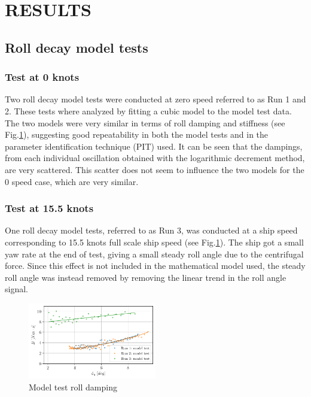\section*{RESULTS}\label{results}
\subsection*{Roll decay model tests}\label{roll-decay-model-tests}
\subsubsection*{Test at 0 knots}\label{test-at-0-knots}
Two roll decay model tests were conducted at zero speed referred to as
Run 1 and 2.
These tests where analyzed by fitting a cubic model
to the model test data. The two models were very similar in terms of
roll damping and stiffness (see Fig.\ref{fig:mdl}), suggesting
good repeatability in both the model tests and in the parameter
identification technique (PIT) used. It can be seen that the dampings,
from each individual oscillation obtained with the logarithmic decrement
method, are very scattered. This scatter does not seem to influence the
two models for the 0 speed case, which are very similar.
\subsubsection*{Test at 15.5 knots}\label{test-at-15.5-knots}
One roll decay model tests, referred to as Run 3, was conducted at a
ship speed corresponding to 15.5 knots full scale ship speed (see
Fig.\ref{fig:mdl}). The ship got a small yaw rate
at the end of test, giving a small steady roll angle due to the
centrifugal force. Since this effect is not included in the mathematical
model used, the steady roll angle was instead removed by removing the
linear trend in the roll angle signal.
\begin{figure}[H]
\begin{center}\includegraphics[width = 0.5\textwidth]{figures/mdl.pdf}\end{center}
\vspace{-1cm}
\caption{Model test roll damping}
\label{fig:mdl}
\end{figure}
